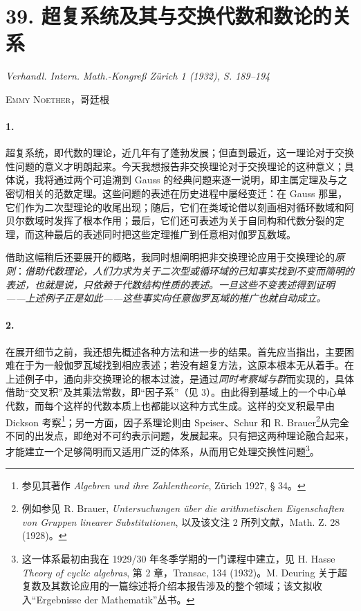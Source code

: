 \documentclass[11pt]{article}
\begin{document}
\section*{39. 超复系统及其与交换代数和数论的关系}

\begin{center}
\emph{Verhandl. Intern. Math.-Kongreß Zürich 1 (1932), S. 189--194}
\end{center}

\begin{center}
\textsc{Emmy Noether，哥廷根}
\end{center}

\paragraph{1.}
超复系统，即代数的理论，近几年有了蓬勃发展；但直到最近，这一理论对于交换性问题的意义才明朗起来。今天我想报告非交换理论对于交换理论的这种意义；具体说，我将通过两个可追溯到 Gauss 的经典问题来逐一说明，即主属定理及与之密切相关的范数定理。这些问题的表述在历史进程中屡经变迁：在 Gauss 那里，它们作为二次型理论的收尾出现；随后，它们在类域论借以刻画相对循环数域和阿贝尔数域时发挥了根本作用；最后，它们还可表述为关于自同构和代数分裂的定理，而这种最后的表述同时把这些定理推广到任意相对伽罗瓦数域。

借助这幅稍后还要展开的概略，我同时想阐明把非交换理论应用于交换理论的\emph{原则}：\emph{借助代数理论，人们力求为关于二次型或循环域的已知事实找到不变而简明的表述，也就是说，只依赖于代数结构性质的表述。一旦这些不变表述得到证明——上述例子正是如此——这些事实向任意伽罗瓦域的推广也就自动成立。}

\paragraph{2.}
在展开细节之前，我还想先概述各种方法和进一步的结果。首先应当指出，主要困难在于为一般伽罗瓦域找到相应表述；若没有超复方法，这原本根本无从着手。在上述例子中，通向非交换理论的根本过渡，是通过\emph{同时考察域与群}而实现的，具体借助“交叉积”及其乘法常数，即“因子系”（见 3）。由此得到基域上的一个中心单代数，而每个这样的代数本质上也都能以这种方式生成。这样的交叉积最早由 Dickson 考察\footnote{参见其著作 \emph{Algebren und ihre Zahlentheorie}, Zürich 1927, § 34。}；另一方面，因子系理论则由 Speiser、Schur 和 R. Brauer\footnote{例如参见 R. Brauer, \emph{Untersuchungen über die arithmetischen Eigenschaften von Gruppen linearer Substitutionen}, 以及该文注 2 所列文献，Math. Z. 28 (1928)。}从完全不同的出发点，即绝对不可约表示问题，发展起来。只有把这两种理论融合起来，才能建立一个足够简明而又适用广泛的体系，从而用它处理交换性问题\footnote{这一体系最初由我在 1929/30 年冬季学期的一门课程中建立，见 H. Hasse \emph{Theory of cyclic algebras}, 第 2 章，Transac, 134 (1932)。M. Deuring 关于超复数及其数论应用的一篇综述将介绍本报告涉及的整个领域；该文拟收入“Ergebnisse der Mathematik”丛书。}。
\end{document}
